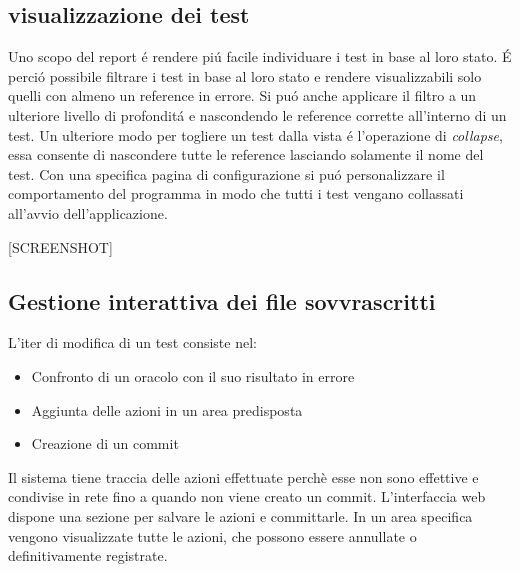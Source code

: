         \subsection{visualizzazione dei test}        
            Uno scopo del report \'e rendere pi\'u facile individuare i test in base al loro stato.
            \'E perci\'o possibile filtrare i test in base al loro stato e rendere visualizzabili solo quelli con almeno un reference in errore.
            Si pu\'o anche applicare il filtro a un ulteriore livello di profondit\'a e nascondendo le reference corrette all'interno di un test.
            Un ulteriore modo per togliere un test dalla vista \'e l'operazione di \textit{collapse}, essa consente di nascondere tutte le reference lasciando solamente il nome del test.
            Con una specifica pagina di configurazione si pu\'o personalizzare il comportamento del programma in modo che tutti i test vengano collassati all'avvio dell'applicazione.

            [SCREENSHOT]

        \subsection{Gestione interattiva dei file sovvrascritti}
            L'iter di modifica di un test consiste nel: 
            \begin{itemize}
                \item Confronto di un oracolo con il suo risultato in errore
                \item Aggiunta delle azioni in un area predisposta
                \item Creazione di un commit
            \end{itemize}      
            Il sistema tiene traccia delle azioni effettuate perchè esse non sono effettive e condivise in rete fino a quando non viene creato un commit.
            L'interfaccia web dispone una sezione per salvare le azioni e committarle.
            In un area specifica vengono visualizzate tutte le azioni, che possono essere annullate o definitivamente registrate.
